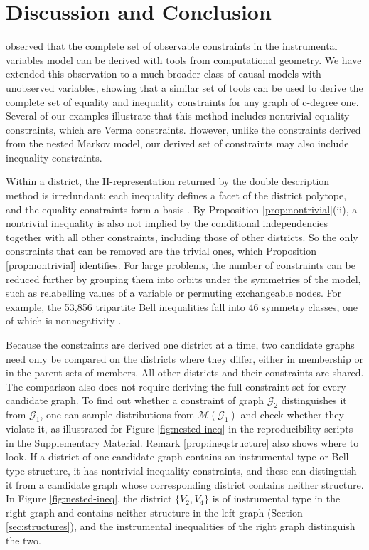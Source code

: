 \documentclass[12pt]{article}
\begin{document}
\section{Discussion and Conclusion}

\citet{bonet2001instrumentality} observed that the complete set of observable constraints in the instrumental variables model can be derived with tools from computational geometry. We have extended this observation to a much broader class of causal models with unobserved variables, showing that a similar set of tools can be used to derive the complete set of equality and inequality constraints for any graph of c-degree one. Several of our examples illustrate that this method includes nontrivial equality constraints, which are Verma constraints. However, unlike the constraints derived from the nested Markov model, our derived set of constraints may also include inequality constraints. 


Within a district, the H-representation returned by the double description method is irredundant: each inequality defines a facet of the district polytope, and the equality constraints form a basis \citep{fukuda1996double}. By Proposition \ref{prop:nontrivial}(ii), a nontrivial inequality is also not implied by the conditional independencies together with all other constraints, including those of other districts. So the only constraints that can be removed are the trivial ones, which Proposition \ref{prop:nontrivial} identifies. For large problems, the number of constraints can be reduced further by grouping them into orbits under the symmetries of the model, such as relabelling values of a variable or permuting exchangeable nodes. For example, the 53,856 tripartite Bell inequalities fall into 46 symmetry classes, one of which is nonnegativity \citep{Sliwa2003Symmetries}.

Because the constraints are derived one district at a time, two candidate graphs need only be compared on the districts where they differ, either in membership or in the parent sets of members. All other districts and their constraints are shared. The comparison also does not require deriving the full constraint set for every candidate graph. To find out whether a constraint of graph $\mathcal{G}_2$ distinguishes it from $\mathcal{G}_1$, one can sample distributions from $\mathcal{M}(\mathcal{G}_1)$ and check whether they violate it, as illustrated for Figure \ref{fig:nested-ineq} in the reproducibility scripts in the Supplementary Material. Remark \ref{prop:ineqstructure} also shows where to look. If a district of one candidate graph contains an instrumental-type or Bell-type structure, it has nontrivial inequality constraints, and these can distinguish it from a candidate graph whose corresponding district contains neither structure. In Figure \ref{fig:nested-ineq}, the district $\{V_2, V_4\}$ is of instrumental type in the right graph and contains neither structure in the left graph (Section \ref{sec:structures}), and the instrumental inequalities of the right graph distinguish the two.
\end{document}
